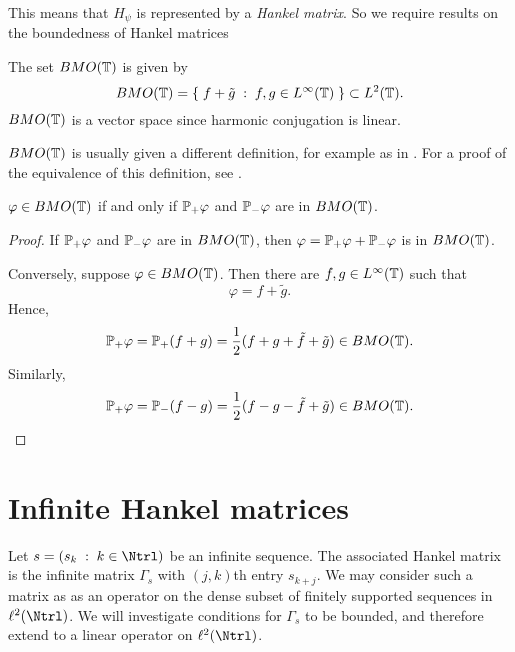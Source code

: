 \documentclass{unswmaths}
\begin{document}
This means that $H_\psi$ is represented by a \emph{Hankel matrix}. So we require
results on the boundedness of Hankel matrices



\begin{definition}
    The set ${BMO}(\mathbb{T})$ is given by
    \begin{equation*}
        BMO(\mathbb{T}) = \{\;f+\tilde{g}\;:\;f,g \in L^\infty(\mathbb{T})\;\} \subset L^2(\mathbb{T}).
    \end{equation*}
    ${BMO}(\mathbb{T})$ is a vector space since harmonic conjugation is linear.
\end{definition}
${BMO}(\mathbb{T})$ is usually given a different definition, for example as in \cite[p.~216]{garnett}.
For a proof of the equivalence of this definition, see \cite[p.~240]{garnett}.


\begin{lemma}
    $\varphi \in {BMO}(\mathbb{T})$ if and only if $\mathbb{P}_+\varphi$ and $\mathbb{P}_-\varphi$ are in ${BMO}(\mathbb{T})$.
\end{lemma}
\begin{proof}
    If $\mathbb{P}_+\varphi$ and $\mathbb{P}_-\varphi$ are in ${BMO}(\mathbb{T})$, then $\varphi = \mathbb{P}_+\varphi +\mathbb{P}_-\varphi$ is
    in ${BMO}(\mathbb{T})$.
    
    Conversely, suppose $\varphi \in {BMO}(\mathbb{T})$. Then there are $f,g \in L^\infty(\mathbb{T})$ such that
    \begin{equation*}
        \varphi = f + \tilde{g}.
    \end{equation*}
    Hence,
    \begin{equation*}
        \mathbb{P}_+\varphi = \mathbb{P}_+(f+g) = \frac{1}{2}(f+g+\tilde{f}+\tilde{g}) \in {BMO}(\mathbb{T}).
    \end{equation*}
    Similarly,
    \begin{equation*}
        \mathbb{P}_+\varphi = \mathbb{P}_-(f-g) = \frac{1}{2}(f-g-\tilde{f}+\tilde{g}) \in {BMO}(\mathbb{T}).
    \end{equation*}
\end{proof}


\section*{Infinite Hankel matrices}
Let $s = (s_k\;:\;k \in \Ntrl)$ be an infinite sequence. The associated
Hankel matrix is the infinite matrix $\Gamma_s$ with $(j,k)$th entry
$s_{k+j}$. We may consider such a matrix as as an operator
on the dense subset of finitely supported sequences in $\ell^2(\Ntrl)$. We will investigate conditions
for $\Gamma_s$ to be bounded, and therefore extend to a linear operator on $\ell^2(\Ntrl)$.
\end{document}
